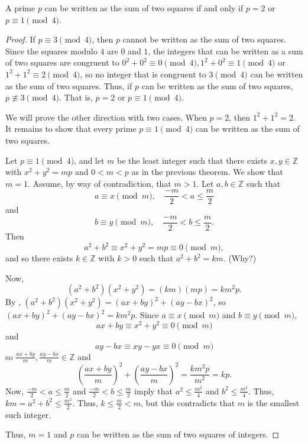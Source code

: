 \documentclass{ximera}
\begin{document}
\begin{proposition}\label{prop:primes-sum-sqrs}
	A prime $p$ can be written as the sum of two squares if and only if $p=2$ or $p\equiv 1 \pmod4$.
   
   \begin{proof}
	   If $p\equiv 3 \pmod 4$, then $p$ cannot be written as the sum of two squares. Since the squares modulo $4$ are $0$ and $1$, the integers that can be written as a sum of two squares are congruent to $0^2+0^2\equiv 0 \pmod 4, 1^2+0^2\equiv 1 \pmod 4$ or $1^2+1^2\equiv 2 \pmod 4$, so no integer that is congruent to $3\pmod 4$ can be written as the sum of two squares. Thus, if $p$ can be written as the sum of two squares, $p\nequiv 3 \pmod 4.$ That is, $p=2$ or $p\equiv 1 \pmod 4$.
	
	   We will prove the other direction with two cases. When $p=2$, then $1^2+1^2=2$. It remains to show that every prime $p\equiv 1 \pmod 4$ can be written as the sum of two squares.
	
	   Let $p\equiv 1\pmod 4$, and let $m$ be the least integer such that there exists $x,y\in\mathbb{Z}$ with $x^2+y^2=mp$ and $0<m<p$ as in the previous theorem. We show that $m=1$. Assume, by way of contradiction, that $m>1$. Let $a,b\in\mathbb{Z}$ such that \[a\equiv x\pmod m,\quad \frac{-m}{2}<a\leq\frac{m}{2}\] and \[b\equiv y\pmod m,\quad \frac{-m}{2}<b\leq\frac{m}{2}.\] Then \[a^2+b^2\equiv x^2+y^2=mp\equiv 0\pmod m,\] and so there exists $k\in\mathbb{Z}$ with $k>0$ such that $a^2+b^2=km$. (Why?)
	 
	   Now, \[(a^2+b^2)(x^2+y^2)=(km)(mp)=km^2p.\] By , $(a^2+b^2)(x^2+y^2)=(ax+by)^2+(ay-bx)^2$, so $(ax+by)^2+(ay-bx)^2=km^2p$. Since $a\equiv x\pmod m$ and $b\equiv y\pmod m$, \[ax+by\equiv x^2+y^2\equiv 0\pmod m\] and \[ay-bx\equiv xy-yx\equiv 0\pmod m\] so $\frac{ax+by}{m},\frac{ay-bx}{m}\in\mathbb{Z}$ and \[\left(\frac{ax+by}{m}\right)^2+\left(\frac{ay-bx}{m}\right)^2=\frac{km^2p}{m^2}=kp.\]  Now, $\frac{-m}{2}<a\leq\frac{m}{2}$ and $\frac{-m}{2}<b\leq\frac{m}{2}$  imply that $a^2\leq\frac{m^2}{4}$ and $b^2\leq\frac{m^2}{4}$. Thus, $km=a^2+b^2\leq\frac{m^2}{2}$. Thus, $k\leq \frac{m}{2}<m$, but this contradicts that $m$ is the smallest such integer.
		
	   Thus, $m=1$ and $p$ can be written as the sum of two squares of integers.
   \end{proof}
   \end{proposition}
\end{document}
